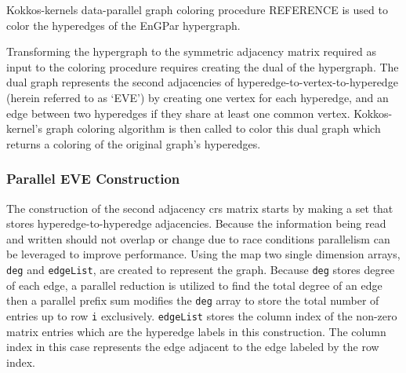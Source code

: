 \documentclass[graybox]{svmult}
\begin{document}
Kokkos-kernels data-parallel graph coloring procedure REFERENCE is used to
color the hyperedges of the EnGPar hypergraph.

Transforming the hypergraph to the symmetric adjacency matrix required as input
to the coloring procedure requires creating the dual of the hypergraph.
The dual graph represents the second adjacencies of
hyperedge-to-vertex-to-hyperedge (herein referred to as `EVE') by creating one
vertex for each hyperedge, and an edge between two hyperedges if they share at
least one common vertex.
Kokkos-kernel's graph coloring algorithm is then called to color this dual graph
which returns a coloring of the original graph's hyperedges.

\subsubsection{Parallel EVE Construction}

The construction of the second adjacency crs matrix starts by making a
set that stores hyperedge-to-hyperedge adjacencies. Because the information being read and written should not overlap or change due to race conditions parallelism can be leveraged to improve performance. Using the map two single dimension arrays, \verb|deg| and \verb|edgeList|, are created to represent the graph. Because \verb|deg| stores degree of each edge, a parallel reduction is utilized to find the total degree of an edge then a parallel prefix sum modifies the \verb|deg| array to store the total number of entries up to row \verb|i| exclusively. \verb|edgeList| stores the column index of the non-zero matrix entries which are the hyperedge labels in this construction. The column index in this case represents the edge adjacent to the edge labeled by the row index.
\end{document}
